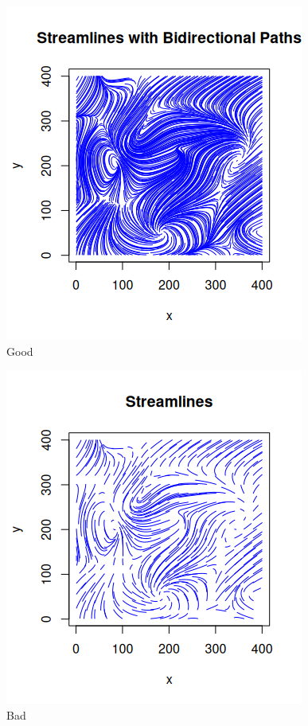 \documentclass[12pt,a4paper]{report}
\begin{document}
\begin{figure}[H]
\centering
\includegraphics[width=\textwidth]{../Code/week 10/good streamline.png}
\caption{Good}
\end{figure}


\begin{figure}[H]
\centering
\includegraphics[width=\textwidth]{../Code/week 10/bad streamlines.png}
\caption{Bad}
\end{figure}
\end{document}
